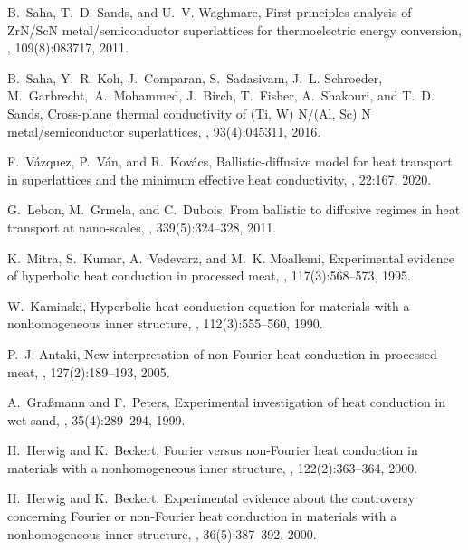 \documentclass[sn-mathphys]{sn-jnl}%
\theoremstyle{thmstyleone}%
\theoremstyle{thmstyletwo}%
\theoremstyle{thmstylethree}%
\begin{document}
\begin{thebibliography}{9}
	B.~Saha, T.~D. Sands, and U.~V. Waghmare,
	\newblock First-principles analysis of {ZrN/ScN} metal/semiconductor
	superlattices for thermoelectric energy conversion,
	, 109(8):083717, 2011.
	
	B.~Saha, Y.~R. Koh, J.~Comparan, S.~Sadasivam, J.~L. Schroeder, M.~Garbrecht, A.~Mohammed, J.~Birch, T.~Fisher, A.~Shakouri, and T.~D. Sands,
	\newblock Cross-plane thermal conductivity of {(Ti, W) N/(Al, Sc) N}
	metal/semiconductor superlattices,
	, 93(4):045311, 2016.
	
	F.~V\'azquez, P.~V\'an, and R.~Kov\'acs,
	\newblock Ballistic-diffusive model for heat transport in superlattices and the
	minimum effective heat conductivity,
	, 22:167, 2020.
	
	G.~Lebon, M.~Grmela, and C.~Dubois,
	\newblock From ballistic to diffusive regimes in heat transport at nano-scales,
	, 339(5):324--328, 2011.
	
	K.~Mitra, S.~Kumar, A.~Vedevarz, and M.~K. Moallemi,
	\newblock Experimental evidence of hyperbolic heat conduction in processed
	meat,
	, 117(3):568--573, 1995.
	
	W.~Kaminski,
	\newblock Hyperbolic heat conduction equation for materials with a
	nonhomogeneous inner structure,
	, 112(3):555--560, 1990.
	
	P.~J. Antaki,
	\newblock New interpretation of non-{F}ourier heat conduction in processed
	meat,
	, 127(2):189--193, 2005.
	
	A.~Gra{\ss}mann and F.~Peters,
	\newblock Experimental investigation of heat conduction in wet sand,
	, 35(4):289--294, 1999.
	
	H.~Herwig and K.~Beckert,
	\newblock Fourier versus non-{F}ourier heat conduction in materials with a
	nonhomogeneous inner structure,
	, 122(2):363--364, 2000.
	
	H.~Herwig and K.~Beckert,
	\newblock Experimental evidence about the controversy concerning {F}ourier or
	non-{F}ourier heat conduction in materials with a nonhomogeneous inner
	structure,
	, 36(5):387--392, 2000.
	

\end{thebibliography}
\end{document}
